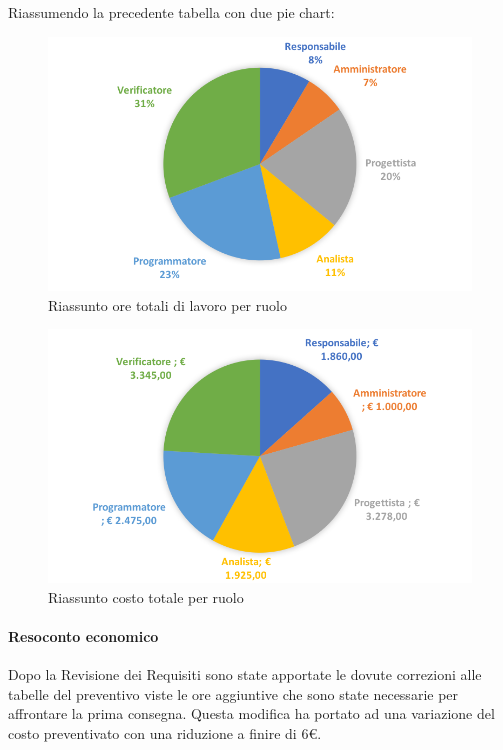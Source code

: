 \documentclass[../PianoDiProgetto_v4.0.0.tex]{subfiles}
\begin{document}
			Riassumendo la precedente tabella con due pie chart:	
			\begin{figure}[!h]
				\centering
				\includegraphics[width=\textwidth]{Preventivo/Immagini/rendicontato_oreRuolo.png}
				\caption{Riassunto ore totali di lavoro per ruolo}
			\end{figure}	
			\newpage
			\begin{figure}[!h]
				\centering
				\includegraphics[width=\textwidth]{Preventivo/Immagini/rendicontato_costoRuolo.png}
				\caption{Riassunto costo totale per ruolo}
			\end{figure}
			
			\paragraph{Resoconto economico} Dopo la Revisione dei Requisiti sono state apportate le dovute correzioni alle tabelle del preventivo viste le ore aggiuntive che sono state necessarie per affrontare la prima consegna. Questa modifica ha portato ad una variazione del costo preventivato con una riduzione a finire di 6\euro.
\end{document}
